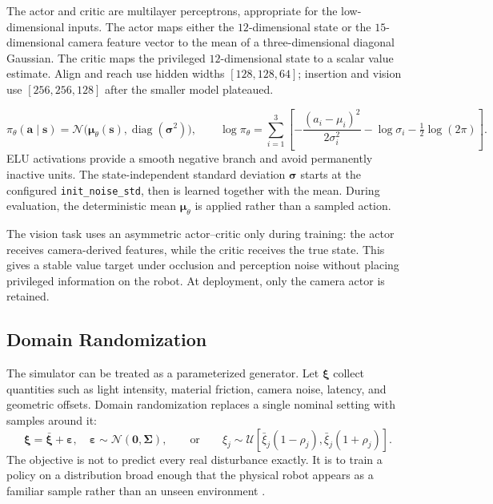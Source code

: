 The actor and critic are multilayer perceptrons, appropriate for the low-dimensional inputs. The actor maps either the $12$-dimensional state or the $15$-dimensional camera feature vector to the mean of a three-dimensional diagonal Gaussian. The critic maps the privileged $12$-dimensional state to a scalar value estimate. Align and reach use hidden widths $[128,128,64]$; insertion and vision use $[256,256,128]$ after the smaller model plateaued.

\begin{equation}
\pi_\theta(\bm a\mid\bm s)=\mathcal N\!\big(\bm\mu_\theta(\bm s),\operatorname{diag}(\bm\sigma^2)\big),\qquad
\log\pi_\theta=\sum_{i=1}^{3}\left[-\frac{(a_i-\mu_i)^2}{2\sigma_i^2}-\log\sigma_i-\tfrac12\log(2\pi)\right].
\label{rl:eq:rl-gauss}
\end{equation}
ELU activations provide a smooth negative branch and avoid permanently inactive units. The state-independent standard deviation $\bm\sigma$ starts at the configured \texttt{init\_noise\_std}, then is learned together with the mean. During evaluation, the deterministic mean $\bm\mu_\theta$ is applied rather than a sampled action.

The vision task uses an asymmetric actor--critic only during training: the actor receives camera-derived features, while the critic receives the true state. This gives a stable value target under occlusion and perception noise without placing privileged information on the robot. At deployment, only the camera actor is retained.

\rlFloatBarrier

\subsection{Domain Randomization}\label{rl:sec:rl-dr}

The simulator can be treated as a parameterized generator. Let $\bm\xi$ collect quantities such as light intensity, material friction, camera noise, latency, and geometric offsets. Domain randomization replaces a single nominal setting with samples around it:
\begin{equation}
\bm\xi=\bar{\bm\xi}+\bm\varepsilon,\quad\bm\varepsilon\sim\mathcal N(\bm0,\bm\Sigma),
\qquad\text{or}\qquad
\xi_j\sim\mathcal U\!\left[\bar\xi_j(1-\rho_j),\bar\xi_j(1+\rho_j)\right].
\label{rl:eq:rl-dr}
\end{equation}
The objective is not to predict every real disturbance exactly. It is to train a policy on a distribution broad enough that the physical robot appears as a familiar sample rather than an unseen environment \cite{tobin_2017_domainrand,peng_2018_dynamicsrand,zhao_2020_sim2realsurvey}.

